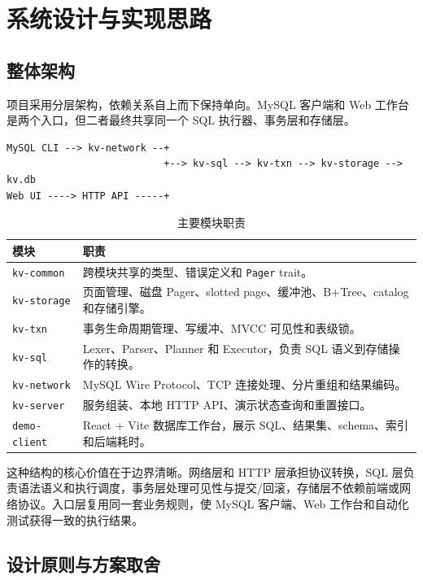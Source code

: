 \documentclass[UTF8,a4paper,12pt]{ctexart}
\newcommand{\code}[1]{\texttt{#1}}
\begin{document}
\section{系统设计与实现思路}

\subsection{整体架构}

项目采用分层架构，依赖关系自上而下保持单向。MySQL 客户端和 Web 工作台是两个入口，但二者最终共享同一个 SQL 执行器、事务层和存储层。

\begin{verbatim}
MySQL CLI --> kv-network --+
                           +--> kv-sql --> kv-txn --> kv-storage --> kv.db
Web UI ----> HTTP API -----+
\end{verbatim}

\begin{table}[H]
\centering
\caption{主要模块职责}
\begin{tabularx}{\textwidth}{p{3.2cm}X}
\toprule
模块 & 职责\\
\midrule
\code{kv-common} & 跨模块共享的类型、错误定义和 \code{Pager} trait。\\
\code{kv-storage} & 页面管理、磁盘 Pager、slotted page、缓冲池、B+Tree、catalog 和存储引擎。\\
\code{kv-txn} & 事务生命周期管理、写缓冲、MVCC 可见性和表级锁。\\
\code{kv-sql} & Lexer、Parser、Planner 和 Executor，负责 SQL 语义到存储操作的转换。\\
\code{kv-network} & MySQL Wire Protocol、TCP 连接处理、分片重组和结果编码。\\
\code{kv-server} & 服务组装、本地 HTTP API、演示状态查询和重置接口。\\
\code{demo-client} & React + Vite 数据库工作台，展示 SQL、结果集、schema、索引和后端耗时。\\
\bottomrule
\end{tabularx}
\end{table}

这种结构的核心价值在于边界清晰。网络层和 HTTP 层承担协议转换，SQL 层负责语法语义和执行调度，事务层处理可见性与提交/回滚，存储层不依赖前端或网络协议。入口层复用同一套业务规则，使 MySQL 客户端、Web 工作台和自动化测试获得一致的执行结果。

\subsection{设计原则与方案取舍}
\end{document}
